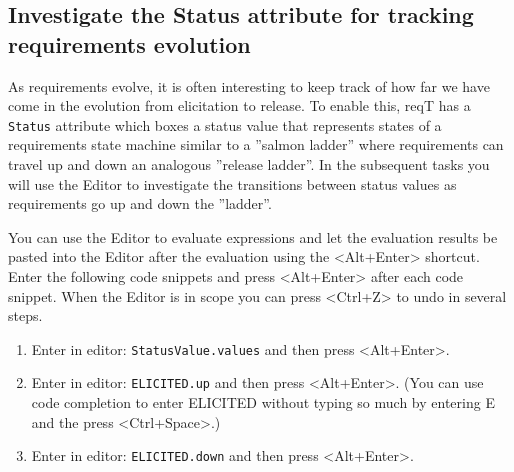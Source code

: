 \documentclass[11pt]{article}
\begin{document}
\subsection{Investigate the Status attribute for tracking requirements evolution}

As requirements evolve, it is often interesting to keep track of how far we have come in the evolution from elicitation to release. To enable this, reqT has a \verb+Status+ attribute which boxes a status value that  represents states of a requirements state machine similar to a ''salmon ladder'' where requirements can travel up and down an analogous ''release ladder''. In the subsequent tasks you will use the Editor to investigate the transitions between status values as requirements go up and down the ''ladder''.  

\begin{framed}
\noindent You can use the Editor to evaluate expressions and let the evaluation results be pasted into the Editor after the evaluation using the <Alt+Enter> shortcut. Enter the following code snippets and press <Alt+Enter> after each code snippet. When the Editor is in scope you can press <Ctrl+Z> to undo in several steps.
\begin{enumerate}
\item Enter in editor: \verb+StatusValue.values+ and then press <Alt+Enter>.
\item Enter in editor: \verb+ELICITED.up+ and then press <Alt+Enter>. (You can use code completion to enter ELICITED without typing so much by entering E and the press <Ctrl+Space>.)
\item Enter in editor: \verb+ELICITED.down+ and then press <Alt+Enter>.
\end{enumerate}
\end{framed}
\end{document}
